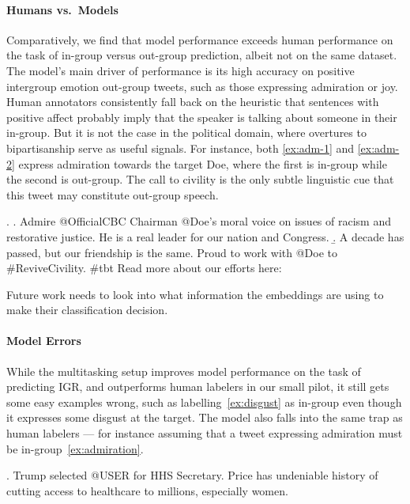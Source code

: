 

\paragraph{Humans vs.\ Models}

Comparatively, we find that model performance exceeds human performance on the task of in-group versus out-group prediction, albeit not on the same dataset. The model's main driver of performance is its high accuracy on positive intergroup emotion out-group tweets, such as those expressing admiration or joy. Human annotators consistently fall back on the heuristic that sentences with positive affect probably imply that the speaker is talking about someone in their in-group. But it is not the case in the political domain, where overtures to bipartisanship serve as useful signals. For instance, both \ref{ex:adm-1} and \ref{ex:adm-2} express admiration towards the target Doe, where the first is in-group while the second is out-group. The call to civility is the only subtle linguistic cue that this tweet may constitute out-group speech.

\ex. \a.\label{ex:adm-1} Admire @OfficialCBC Chairman @Doe's moral voice on issues of racism and restorative justice. He is a real leader for our nation and Congress.
     \b.\label{ex:adm-2} A decade has passed, but our friendship is the same. Proud to work with @Doe to \#ReviveCivility. \#tbt Read more about our efforts here:
     
Future work needs to look into what information the embeddings are using to make their classification decision.



\paragraph{Model Errors} While the multitasking setup improves model performance on the task of predicting IGR, and outperforms human labelers in our small pilot, it still gets some easy examples wrong, such as labelling~\ref{ex:disgust} as in-group even though it expresses some disgust at the target. The model also falls into the same trap as human labelers --- for instance assuming that a tweet expressing admiration must be in-group~\ref{ex:admiration}.

\ex.\label{ex:disgust} Trump selected @USER for HHS Secretary. Price has undeniable history of cutting access to healthcare to millions, especially women.

